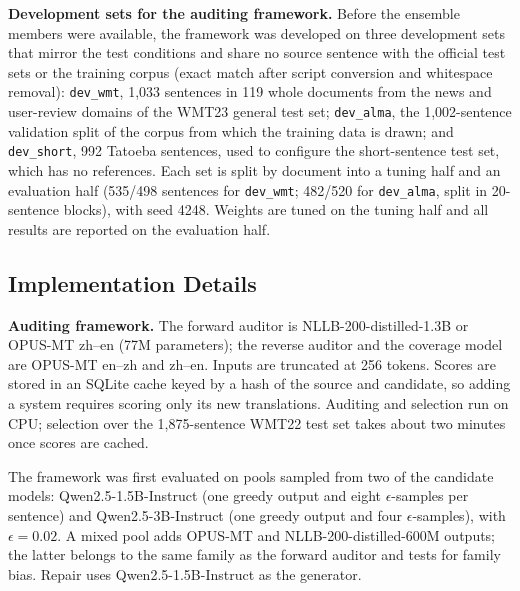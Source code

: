 \documentclass[11pt]{article}
\begin{document}
\textbf{Development sets for the auditing framework.} Before the ensemble members were available, the framework was developed on three development sets that mirror the test conditions and share no source sentence with the official test sets or the training corpus (exact match after script conversion and whitespace removal): \texttt{dev\_wmt}, 1,033 sentences in 119 whole documents from the news and user-review domains of the WMT23 general test set; \texttt{dev\_alma}, the 1,002-sentence validation split of the corpus from which the training data is drawn; and \texttt{dev\_short}, 992 Tatoeba sentences, used to configure the short-sentence test set, which has no references. Each set is split by document into a tuning half and an evaluation half (535/498 sentences for \texttt{dev\_wmt}; 482/520 for \texttt{dev\_alma}, split in 20-sentence blocks), with seed 4248. Weights are tuned on the tuning half and all results are reported on the evaluation half.

\subsection{Implementation Details}
\label{subsec:implementation}
\textbf{Auditing framework.} The forward auditor is NLLB-200-distilled-1.3B or OPUS-MT zh--en (77M parameters); the reverse auditor and the coverage model are OPUS-MT en--zh and zh--en. Inputs are truncated at 256 tokens. Scores are stored in an SQLite cache keyed by a hash of the source and candidate, so adding a system requires scoring only its new translations. Auditing and selection run on CPU; selection over the 1,875-sentence WMT22 test set takes about two minutes once scores are cached.

The framework was first evaluated on pools sampled from two of the candidate models: Qwen2.5-1.5B-Instruct (one greedy output and eight $\epsilon$-samples per sentence) and Qwen2.5-3B-Instruct (one greedy output and four $\epsilon$-samples), with $\epsilon=0.02$. A mixed pool adds OPUS-MT and NLLB-200-distilled-600M outputs; the latter belongs to the same family as the forward auditor and tests for family bias. Repair uses Qwen2.5-1.5B-Instruct as the generator.
\end{document}

